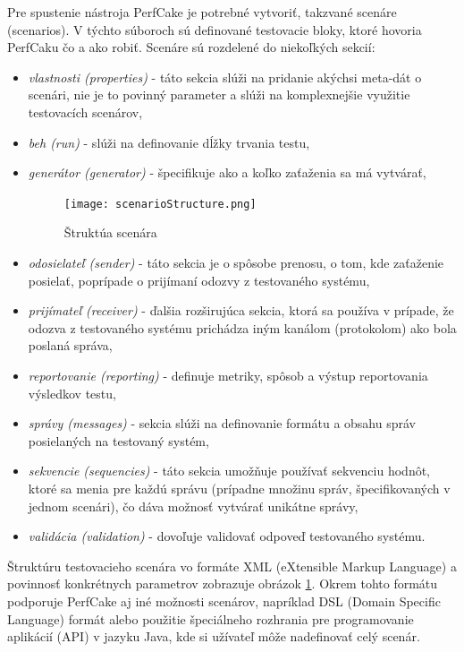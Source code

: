 Pre spustenie nástroja PerfCake je potrebné vytvoriť, takzvané scenáre (scenarios). V týchto súboroch sú definované testovacie bloky, ktoré hovoria PerfCaku čo a ako robiť. Scenáre sú rozdelené do niekoľkých sekcií:
\begin{itemize}
\item \textit{vlastnosti (properties)} - táto sekcia slúži na pridanie akýchsi meta-dát o scenári, nie je to povinný parameter a slúži na komplexnejšie využitie testovacích scenárov,
\item \textit{beh (run)} - slúži na  definovanie dĺžky trvania testu,
\item \textit{generátor (generator)} - špecifikuje ako a koľko zaťaženia sa má vytvárať,
\begin{figure}[!ht]
\centering
\texttt{[image: scenarioStructure.png]} 
\caption{Štruktúa scenára}\label{scenarioStructure}
\end{figure}
\item \textit{odosielateľ (sender)} - táto sekcia je o spôsobe prenosu, o tom, kde zaťaženie posielať, poprípade o prijímaní odozvy z testovaného systému,
\item \textit{prijímateľ (receiver)} - ďalšia rozširujúca sekcia, ktorá sa používa v prípade, že odozva z testovaného systému prichádza iným kanálom (protokolom) ako bola poslaná správa,
\item \textit{reportovanie (reporting)} - definuje metriky, spôsob a výstup reportovania výsledkov testu,
\item \textit{správy (messages)} -  sekcia slúži na definovanie formátu a obsahu správ posielaných na testovaný systém,
\item \textit{sekvencie (sequencies)} - táto sekcia umožňuje používať sekvenciu hodnôt, ktoré sa menia pre každú správu (prípadne množinu správ, špecifikovaných v jednom scenári), čo dáva možnosť vytvárať unikátne správy,
\item \textit{validácia (validation)} - dovoľuje validovať odpoveď  testovaného systému.
\end{itemize}

Štruktúru testovacieho scenára vo formáte XML (eXtensible Markup Language) a povinnosť konkrétnych parametrov zobrazuje obrázok \ref{scenarioStructure}. Okrem tohto formátu podporuje PerfCake aj iné možnosti scenárov, napríklad DSL (Domain Specific Language) formát alebo použitie špeciálneho rozhrania pre programovanie aplikácií (API) v jazyku Java, kde si užívateľ môže nadefinovať celý scenár.


